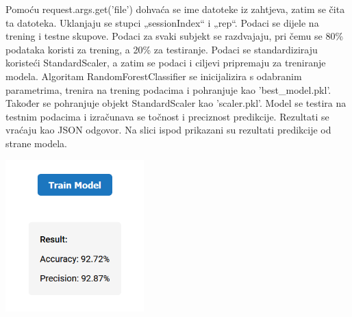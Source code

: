 \documentclass[]{foi}
\begin{document}
Pomoću request.args.get('file') dohvaća se ime datoteke iz zahtjeva, zatim se čita ta datoteka. Uklanjaju se stupci „sessionIndex“ i „rep“. Podaci se dijele na trening i testne skupove. Podaci za svaki subjekt se razdvajaju, pri čemu se 80\% podataka koristi za trening, a 20\% za testiranje. Podaci se standardiziraju koristeći StandardScaler, a zatim se podaci i ciljevi pripremaju za treniranje modela. Algoritam RandomForestClassifier se inicijalizira s odabranim parametrima, trenira na trening podacima i pohranjuje kao 'best\_model.pkl'. Također se pohranjuje objekt StandardScaler kao 'scaler.pkl'. Model se testira na testnim podacima i izračunava se točnost i preciznost predikcije. Rezultati se vraćaju kao JSON odgovor. Na slici ispod prikazani su rezultati predikcije od strane modela.

\begin{center}
    \includegraphics[width=0.4\textwidth]{slike/app_model_rezultati.png}
    \label{fig:app-model-rezultati}
\end{center}

\makebackmatter
\end{document}
